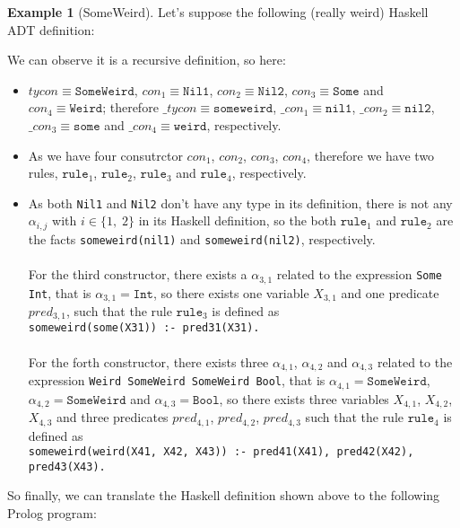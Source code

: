 \documentclass{report}
\theoremstyle{definition}
\newtheorem{example}{Example}[section]
\theoremstyle{definition}
\newcommand{\ttt}[1]{\texttt{#1}}
\begin{document}
\begin{example}[SomeWeird]
	Let's suppose the following (really weird) Haskell ADT definition:
	
	We can observe it is a recursive definition, so here:
	\begin{itemize}
		\item $tycon \equiv \ttt{SomeWeird}$, $con_1 \equiv \ttt{Nil1}$, $con_2 \equiv \ttt{Nil2}$, $con_3 \equiv \ttt{Some}$ and $con_4 \equiv \ttt{Weird}$; therefore $\_tycon \equiv \ttt{someweird}$, $\_con_1 \equiv \ttt{nil1}$, $\_con_2 \equiv \ttt{nil2}$, $\_con_3 \equiv \ttt{some}$ and $\_con_4 \equiv \ttt{weird}$, respectively.
		\item As we have four consutrctor $con_1$, $con_2$, $con_3$, $con_4$, therefore we have two rules, $\ttt{rule}_1$, $\ttt{rule}_2$, $\ttt{rule}_3$ and $\ttt{rule}_4$, respectively.
		\item As both \ttt{Nil1} and \ttt{Nil2} don't have any type in its definition, there is not any $\alpha_{i,j}$ with $i \in \{ 1,\; 2 \}$ in its Haskell definition, so the both $\ttt{rule}_1$ and $\ttt{rule}_2$ are the facts \ttt{someweird(nil1)} and \ttt{someweird(nil2)}, respectively.\\\\
		      For the third constructor, there exists a $\alpha_{3,1}$ related to the expression \ttt{Some Int}, that is $\alpha_{3,1} = \ttt{Int}$, so there exists one variable $X_{3,1}$ and one predicate $pred_{3,1}$, such that the rule $\ttt{rule}_3$ is defined as \\ \ttt{someweird(some(X31)) :- pred31(X31).}\\\\
		      For the forth constructor, there exists three $\alpha_{4,1}$, $\alpha_{4,2}$ and $\alpha_{4,3}$ related to the expression \ttt{Weird SomeWeird SomeWeird Bool}, that is $\alpha_{4,1} = \ttt{SomeWeird}$, $\alpha_{4,2} = \ttt{SomeWeird}$ and $\alpha_{4,3} = \ttt{Bool}$, so there exists three variables $X_{4,1}$, $X_{4,2}$, $X_{4,3}$ and three predicates $pred_{4,1}$, $pred_{4,2}$, $pred_{4,3}$ such that the rule $\ttt{rule}_4$ is defined as \\ \ttt{someweird(weird(X41, X42, X43)) :- pred41(X41), pred42(X42), pred43(X43).}
	\end{itemize}
	So finally, we can translate the Haskell definition shown above to the following Prolog program:\\

\end{example}
\end{document}
